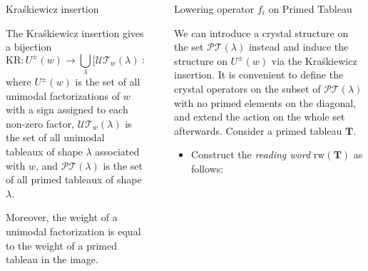 \documentclass[final]{beamer}
\theoremstyle{definition}
\numberwithin{equation}{section}
\newlength{\sepwid}
\newlength{\onecolwid}
\newlength{\twocolwid}
\begin{document}
\begin{frame}[t]
\begin{columns}[t]
\begin{column}{\twocolwid}
\begin{columns}[t]
\begin{column}{\onecolwid}
\begin{alertblock}{Kra\'skiewicz insertion}

The Kra\'skiewicz insertion gives a bijection 
\begin{equation*}
\mathrm{KR}\colon U^{\pm}(w) \rightarrow \bigcup_{\lambda} \big[\mathcal{UT}_w (\lambda) \times \mathcal{PT} (\lambda)\big],
\end{equation*}
where $U^{\pm}(w)$ is the set of all unimodal factorizations of $w$ with a sign assigned to each non-zero factor, $\mathcal{UT}_w (\lambda)$ is the set of all unimodal tableaux of shape $\lambda$ associated with $w$, and $\mathcal{PT} (\lambda)$ is the set of all primed tableaux of shape $\lambda$.

Moreover, the weight of a unimodal factorization is equal to the weight of a primed tableau in the image.

\end{alertblock}

\end{column} %

\end{columns}

\end{column}

\begin{column}{\sepwid}\end{column} %

\begin{column}{\onecolwid} %


\begin{block}{Lowering operator $f_i$ on Primed Tableau}

We can introduce a crystal structure on the set $\mathcal{PT} (\lambda)$ instead and induce the structure on $U^{\pm}(w)$ via the Kra\'skiewicz insertion. It is convenient to define the crystal operators on the subset of $\mathcal{PT} (\lambda)$ with no primed elements on the diagonal, and extend the action on the whole set afterwards. Consider a primed tableau $\mathbf{T}$.

\begin{itemize}
\item Construct the \textit{reading word}  $\mathrm{rw}(\mathbf{T})$ as follows:


\end{itemize}
\end{block}
\end{column}
\end{columns}
\end{frame}
\end{document}
